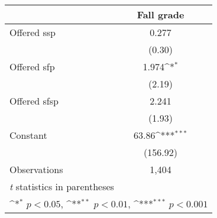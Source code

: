 {
\def\sym#1{\ifmmode^{#1}\else\(^{#1}\)\fi}
\begin{tabular}{l*{1}{c}}
\hline\hline
                &\multicolumn{1}{c}{Fall grade}\\
\hline
Offered ssp     &    0.277         \\
                &   (0.30)         \\
[1em]
Offered sfp     &    1.974\sym{*}  \\
                &   (2.19)         \\
[1em]
Offered sfsp    &    2.241         \\
                &   (1.93)         \\
[1em]
Constant        &    63.86\sym{***}\\
                & (156.92)         \\
\hline
Observations    &    1,404         \\
\hline\hline
\multicolumn{2}{l}{\footnotesize \textit{t} statistics in parentheses}\\
\multicolumn{2}{l}{\footnotesize \sym{*} \(p<0.05\), \sym{**} \(p<0.01\), \sym{***} \(p<0.001\)}\\
\end{tabular}
}
